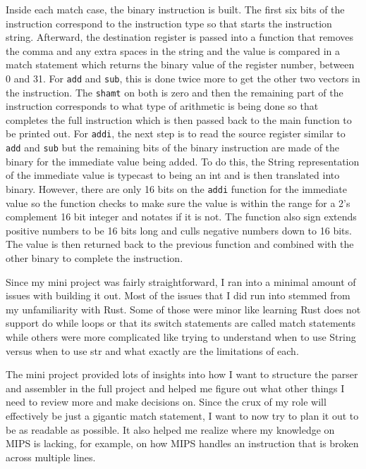\documentclass[
    paper=letter,
    parskip=half,
    fontsize=12pt,
    titlepage=firstiscover,
    toc=bibliography,
    numbers=endperiod
]{scrartcl}
\begin{document}
Inside each match case, the binary instruction is built. The first six
bits of the instruction correspond to the instruction type so that
starts the instruction string. Afterward, the destination register is
passed into a function that removes the comma and any extra spaces in
the string and the value is compared in a match statement which returns
the binary value of the register number, between 0 and 31. For
\texttt{add} and \texttt{sub}, this is done twice more to get the other
two vectors in the instruction. The \texttt{shamt} on both is zero and
then the remaining part of the instruction corresponds to what type of
arithmetic is being done so that completes the full instruction which is
then passed back to the main function to be printed out. For
\texttt{addi}, the next step is to read the source register similar to
\texttt{add} and \texttt{sub} but the remaining bits of the binary
instruction are made of the binary for the immediate value being added.
To do this, the String representation of the immediate value is typecast
to being an int and is then translated into binary. However, there are
only 16 bits on the \texttt{addi} function for the immediate value so
the function checks to make sure the value is within the range for a 2's
complement 16 bit integer and notates if it is not. The function also
sign extends positive numbers to be 16 bits long and culls negative
numbers down to 16 bits. The value is then returned back to the previous
function and combined with the other binary to complete the instruction.

Since my mini project was fairly straightforward, I ran into a minimal
amount of issues with building it out. Most of the issues that I did run
into stemmed from my unfamiliarity with Rust. Some of those were minor
like learning Rust does not support do while loops or that its switch
statements are called match statements while others were more
complicated like trying to understand when to use String versus when to
use str and what exactly are the limitations of each.

The mini project provided lots of insights into how I want to structure
the parser and assembler in the full project and helped me figure out
what other things I need to review more and make decisions on. Since the
crux of my role will effectively be just a gigantic match statement, I
want to now try to plan it out to be as readable as possible. It also
helped me realize where my knowledge on MIPS is lacking, for example, on
how MIPS handles an instruction that is broken across multiple lines.
\end{document}
